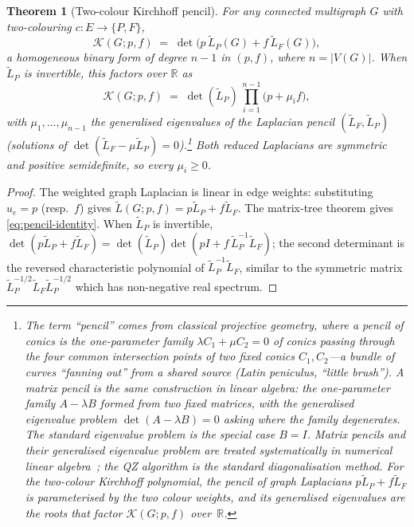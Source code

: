 \documentclass[11pt,a4paper]{article}
\theoremstyle{plain}
\newtheorem{theorem}{Theorem}
\begin{document}
\begin{theorem}[Two-colour Kirchhoff pencil]
\label{thm:pencil}
For any connected multigraph $G$ with two-colouring
$c : E \to \{P,F\}$,
\begin{equation}\label{eq:pencil-identity}
  \mathcal{K}(G; p, f)
  \;=\; \det\bigl(p\,\widetilde L_P(G) + f\,\widetilde L_F(G)\bigr),
\end{equation}
a homogeneous binary form of degree $n{-}1$ in $(p,f)$, where
$n = |V(G)|$.  When $\widetilde L_P$ is invertible, this factors
over $\mathbb{R}$ as
\begin{equation}\label{eq:pencil-product}
  \mathcal{K}(G; p, f)
  \;=\; \det(\widetilde L_P)\,\prod_{i=1}^{n-1}\bigl(p + \mu_i f\bigr),
\end{equation}
with $\mu_1, \ldots, \mu_{n-1}$ the generalised eigenvalues of the
Laplacian pencil $(\widetilde L_F, \widetilde L_P)$
(solutions of $\det(\widetilde L_F - \mu \widetilde L_P) = 0$).\footnote{The
term ``pencil'' comes from classical projective geometry, where a
\emph{pencil of conics} is the one-parameter family
$\lambda C_1 + \mu C_2 = 0$ of conics passing through the four
common intersection points of two fixed conics $C_1, C_2$---a
bundle of curves ``fanning out'' from a shared source (Latin
\textit{peniculus}, ``little brush'').  A \emph{matrix pencil} is
the same construction in linear algebra: the one-parameter family
$A - \lambda B$ formed from two fixed matrices, with the
\emph{generalised eigenvalue problem}
$\det(A - \lambda B) = 0$ asking where the family degenerates.
The standard eigenvalue problem is the special case $B = I$.
Matrix pencils and their generalised eigenvalue problem are
treated systematically in numerical linear
algebra~\citep{GolubVanLoan2013}; the QZ algorithm is the standard
diagonalisation method.  For the two-colour Kirchhoff polynomial,
the pencil of graph Laplacians $p \widetilde L_P + f \widetilde L_F$ is
parameterised by the two colour weights, and its generalised
eigenvalues are the roots that factor $\mathcal{K}(G; p, f)$
over~$\mathbb{R}$.}  Both reduced Laplacians are symmetric and
positive semidefinite, so every $\mu_i \geq 0$.
\end{theorem}

\begin{proof}
The weighted graph Laplacian is linear in edge weights:
substituting $u_e = p$ (resp.\ $f$) gives
$\widetilde L(G; p, f) = p\widetilde L_P + f\widetilde L_F$.  The matrix-tree
theorem gives \eqref{eq:pencil-identity}.  When $\widetilde L_P$ is
invertible,
$\det(p\widetilde L_P + f\widetilde L_F) = \det(\widetilde L_P) \det(p I + f\,
\widetilde L_P^{-1}\widetilde L_F)$;
the second determinant is the reversed characteristic polynomial
of $\widetilde L_P^{-1}\widetilde L_F$, similar to the symmetric matrix
$\widetilde L_P^{-1/2}\widetilde L_F \widetilde L_P^{-1/2}$ which has
non-negative real spectrum.
\end{proof}
\end{document}
